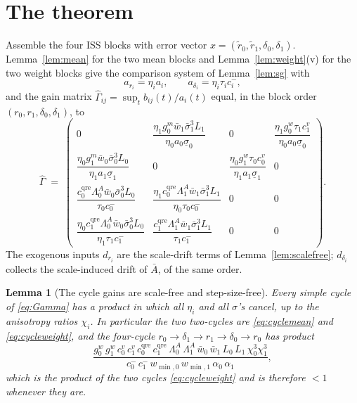 \documentclass[11pt]{article}
\newtheorem{lemma}{Lemma}
\theoremstyle{definition}
\begin{document}
\section{The theorem}\label{sec:thm}

Assemble the four ISS blocks with error vector
$x = (\tilde r_0, \tilde r_1, \delta_0, \delta_1)$. Lemma~\ref{lem:mean} for the
two mean blocks and Lemma~\ref{lem:weight}(v) for the two weight blocks give the
comparison system of Lemma~\ref{lem:sg} with
\[
  a_{r_i} = \eta_i a_i, \qquad a_{\delta_i} = \eta_i\tau_i c^-_i,
\]
and the gain matrix $\hat\Gamma_{ij} = \sup_t b_{ij}(t)/a_i(t)$ equal, in the
block order $(r_0, r_1, \delta_0, \delta_1)$, to
\begin{equation}\label{eq:Gamma}
  \hat\Gamma \;=\;
  \begin{pmatrix}
    0
      & \dfrac{\eta_1 g^m_0 \bar w_1 \bar\sigma_1^3 L_1}
              {\eta_0 a_0 \underline\sigma_0}
      & 0
      & \dfrac{\eta_1 g^w_0 \tau_1 c^v_1}{\eta_0 a_0 \underline\sigma_0}
    \\[10pt]
    \dfrac{\eta_0 g^m_1 \bar w_0 \bar\sigma_0^3 L_0}
          {\eta_1 a_1 \underline\sigma_1}
      & 0
      & \dfrac{\eta_0 g^w_1 \tau_0 c^v_0}{\eta_1 a_1 \underline\sigma_1}
      & 0
    \\[10pt]
    \dfrac{c^{\mathrm{qre}}_0 \Lambda^A_0 \bar w_0 \bar\sigma_0^3 L_0}
          {\tau_0 c^-_0}
      & \dfrac{\eta_1 c^{\mathrm{qre}}_0 \Lambda^A_1 \bar w_1 \bar\sigma_1^3 L_1}
              {\eta_0 \tau_0 c^-_0}
      & 0 & 0
    \\[10pt]
    \dfrac{\eta_0 c^{\mathrm{qre}}_1 \Lambda^A_0 \bar w_0 \bar\sigma_0^3 L_0}
          {\eta_1 \tau_1 c^-_1}
      & \dfrac{c^{\mathrm{qre}}_1 \Lambda^A_1 \bar w_1 \bar\sigma_1^3 L_1}
              {\tau_1 c^-_1}
      & 0 & 0
  \end{pmatrix}.
\end{equation}
The exogenous inputs $d_{r_i}$ are the scale-drift terms of
Lemma~\ref{lem:scalefree}; $d_{\delta_i}$ collects the scale-induced drift of
$\bar A$, of the same order.

\begin{lemma}[The cycle gains are scale-free and step-size-free]
\label{lem:cyclefree}
Every simple cycle of \eqref{eq:Gamma} has a product in which all $\eta_i$ and
all $\sigma$'s cancel, up to the anisotropy ratios $\chi_i$. In particular the
two two-cycles are \eqref{eq:cyclemean} and \eqref{eq:cycleweight}, and the
four-cycle $r_0 \to \delta_1 \to r_1 \to \delta_0 \to r_0$ has product
\[
  \frac{g^w_0\, g^w_1\, c^v_0\, c^v_1\, c^{\mathrm{qre}}_0\, c^{\mathrm{qre}}_1\,
        \Lambda^A_0\,\Lambda^A_1\, \bar w_0\,\bar w_1\, L_0\, L_1\,
        \chi_0^3\chi_1^3}
       {c^-_0\, c^-_1\, w_{\min,0}\,w_{\min,1}\,\alpha_0\,\alpha_1},
\]
which is the product of the two cycles \eqref{eq:cycleweight} and is therefore
$< 1$ whenever they are.
\end{lemma}
\end{document}
